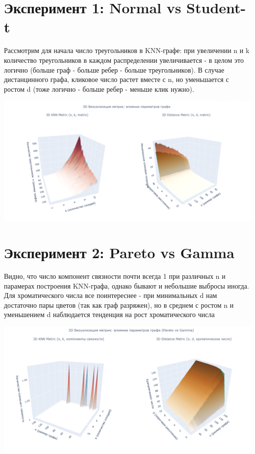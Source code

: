\documentclass[a4paper,12pt]{report}
\begin{document}
\section{Эксперимент 1: Normal vs Student-t}

Рассмотрим для начала число треугольников в KNN-графе: при увеличении n и k количество треугольников в каждом распределении увеличивается - в целом это логично (больше граф - больше ребер - больше треугольников). В случае дистанцинного графа, кликовое число растет вместе с n, но уменьшается с ростом d (тоже логично - больше ребер - меньше клик нужно).


\includegraphics[width=1\linewidth]{images/ilin_part2.png}

\section{Эксперимент 2: Pareto vs Gamma}

Видно, что число компонент связности почти всегда 1 при различных n и парамерах построения KNN-графа, однако бывают и небольшие выбросы иногда. Для хроматического числа все поинтереснее - при минимальных d нам достаточно пары цветов (так как граф разряжен), но в среднем с ростом n и уменьшением d наблюдается тенденция на рост хроматического числа

\includegraphics[width=1\linewidth]{images/kuleshov_part2.png}
\end{document}
